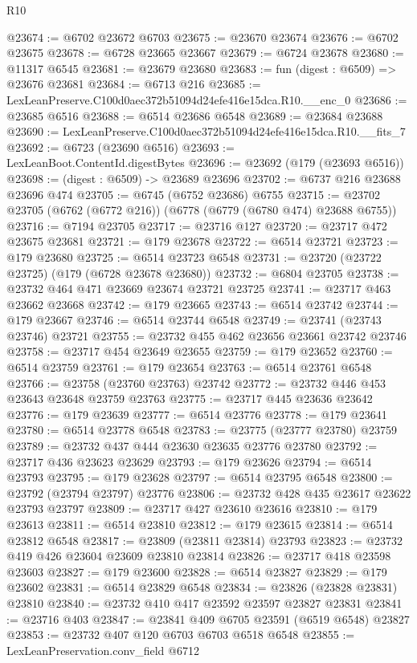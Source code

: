 \begin{lexlean}{R10}
\begin{coremodule}
@23674 := @6702 @23672 @6703
@23675 := @23670 @23674
@23676 := @6702 @23675
@23678 := @6728 @23665 @23667
@23679 := @6724 @23678
@23680 := @11317 @6545
@23681 := @23679 @23680
@23683 := fun (digest : @6509) => @23676 @23681
@23684 := @6713 @216
@23685 := LexLeanPreserve.C100d0aec372b51094d24efe416e15dca.R10.__enc_0
@23686 := @23685 @6516
@23688 := @6514 @23686 @6548
@23689 := @23684 @23688
@23690 := LexLeanPreserve.C100d0aec372b51094d24efe416e15dca.R10.__fits_7
@23692 := @6723 (@23690 @6516)
@23693 := LexLeanBoot.ContentId.digestBytes
@23696 := @23692 (@179 (@23693 @6516))
@23698 := (digest : @6509) -> @23689 @23696
@23702 := @6737 @216 @23688 @23696 @474
@23705 := @6745 (@6752 @23686) @6755
@23715 := @23702 @23705 (@6762 (@6772 @216)) (@6778 (@6779 (@6780 @474) @23688 @6755))
@23716 := @7194 @23705
@23717 := @23716 @127
@23720 := @23717 @472 @23675 @23681
@23721 := @179 @23678
@23722 := @6514 @23721
@23723 := @179 @23680
@23725 := @6514 @23723 @6548
@23731 := @23720 (@23722 @23725) (@179 (@6728 @23678 @23680))
@23732 := @6804 @23705
@23738 := @23732 @464 @471 @23669 @23674 @23721 @23725
@23741 := @23717 @463 @23662 @23668
@23742 := @179 @23665
@23743 := @6514 @23742
@23744 := @179 @23667
@23746 := @6514 @23744 @6548
@23749 := @23741 (@23743 @23746) @23721
@23755 := @23732 @455 @462 @23656 @23661 @23742 @23746
@23758 := @23717 @454 @23649 @23655
@23759 := @179 @23652
@23760 := @6514 @23759
@23761 := @179 @23654
@23763 := @6514 @23761 @6548
@23766 := @23758 (@23760 @23763) @23742
@23772 := @23732 @446 @453 @23643 @23648 @23759 @23763
@23775 := @23717 @445 @23636 @23642
@23776 := @179 @23639
@23777 := @6514 @23776
@23778 := @179 @23641
@23780 := @6514 @23778 @6548
@23783 := @23775 (@23777 @23780) @23759
@23789 := @23732 @437 @444 @23630 @23635 @23776 @23780
@23792 := @23717 @436 @23623 @23629
@23793 := @179 @23626
@23794 := @6514 @23793
@23795 := @179 @23628
@23797 := @6514 @23795 @6548
@23800 := @23792 (@23794 @23797) @23776
@23806 := @23732 @428 @435 @23617 @23622 @23793 @23797
@23809 := @23717 @427 @23610 @23616
@23810 := @179 @23613
@23811 := @6514 @23810
@23812 := @179 @23615
@23814 := @6514 @23812 @6548
@23817 := @23809 (@23811 @23814) @23793
@23823 := @23732 @419 @426 @23604 @23609 @23810 @23814
@23826 := @23717 @418 @23598 @23603
@23827 := @179 @23600
@23828 := @6514 @23827
@23829 := @179 @23602
@23831 := @6514 @23829 @6548
@23834 := @23826 (@23828 @23831) @23810
@23840 := @23732 @410 @417 @23592 @23597 @23827 @23831
@23841 := @23716 @403
@23847 := @23841 @409 @6705 @23591 (@6519 @6548) @23827
@23853 := @23732 @407 @120 @6703 @6703 @6518 @6548
@23855 := LexLeanPreservation.conv_field @6712

\end{coremodule}
\end{lexlean}
